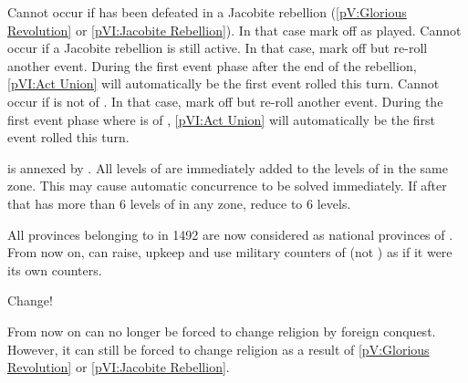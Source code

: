 

\condition{}
\aparag Cannot occur if \ENG has been defeated in a Jacobite rebellion
(\ref{pV:Glorious Revolution} or \ref{pVI:Jacobite Rebellion}). In that case
mark off as played.
\aparag Cannot occur if a Jacobite rebellion is still active.
\bparag In that case, mark off but re-roll another event.
\bparag During the first event phase after the end of the rebellion,
\ref{pVI:Act Union} will automatically be the first event rolled this turn.
\aparag Cannot occur if \paysecosse is not \VASSAL of \ENG.
\bparag In that case, mark off but re-roll another event.
\bparag During the first event phase where \paysecosse is \VASSAL of \ENG,
\ref{pVI:Act Union} will automatically be the first event rolled this turn.

\phevnt
\aparag \paysecosse is annexed by \ENG.
\bparag All \TradeFLEET levels of \paysecosse are immediately added to the
\TradeFLEET levels of \ENG in the same zone. This may cause automatic
concurrence to be solved immediately. If after that \ENG has more than 6
levels of \TradeFLEET in any zone, reduce to 6 levels.

\effetlong
\aparag All provinces belonging to \paysecosse in 1492 are now considered as
national provinces of \ENG.
\aparag From now on, \ENG can raise, upkeep and use military counters of
\paysecosse (not \TradeFLEET) as if it were its own counters.



\begin{todo}
  Change!
\end{todo}

\effetlong
\aparag From now on \ENG can no longer be forced to change religion by foreign
conquest.
\bparag However, it can still be forced to change religion as a result of
\ref{pV:Glorious Revolution} or \ref{pVI:Jacobite Rebellion}.



